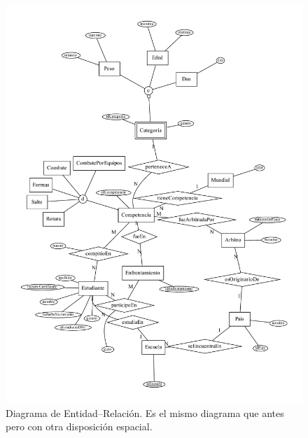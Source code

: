 \begin{figure}[H]
  \centering
  \includegraphics[width=\textwidth]{../mer/mer-neato.pdf}
  \caption{Diagrama de Entidad--Relación. Es el mismo diagrama que antes pero con otra disposición espacial.}
\end{figure}

